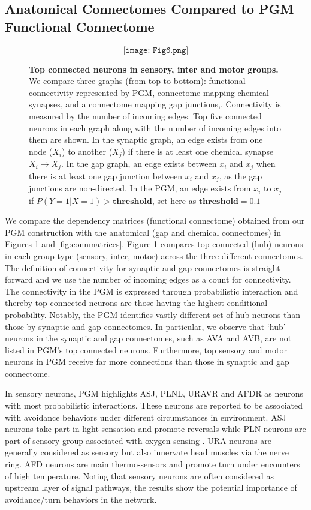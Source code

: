 \documentclass[letterpaper,11pt]{article}
\newcommand\tab[1][6mm]{\hspace*{#1}}
\begin{document}
\subsection{Anatomical Connectomes Compared to  PGM Functional Connectome}
\begin{figure}[h]
  \[\texttt{[image: Fig6.png]}\]
  \caption{\textbf{Top connected neurons in sensory, inter and motor groups.} We compare three graphs (from top to bottom):  functional connectivity represented by PGM, connectome mapping chemical synapses, and a connectome mapping gap junctions,. Connectivity is measured by the number of incoming edges. Top five connected neurons in each graph along with the number of incoming edges into them are shown. In the synaptic graph, an edge exists from one node ($X_i$) to another ($X_j$) if there is at least one chemical synapse $X_i \to X_j$. In the gap graph, an edge exists between $x_i$ and $x_j$ when there is at least one gap junction between $x_i$ and $x_j$, as the gap junctions are non-directed. In the PGM, an edge exists from $x_i$ to $x_j$ if $P(Y=1|X=1)> \textbf{threshold}$, set here as $\textbf{threshold}=0.1$} \label{fig:topconn}
\end{figure}

\tab We compare the dependency matrices (functional connectome) obtained from our PGM construction with the anatomical (gap and chemical connectomes) in Figures \ref{fig:topconn} and \ref{fig:connmatrices}. Figure \ref{fig:topconn} compares top connected (hub) neurons in each group type (sensory, inter, motor) across the three different connectomes. The definition of connectivity for synaptic and gap connectomes is straight forward and we use the number of incoming edges as a count for connectivity. The connectivity in the PGM is expressed through probabilistic interaction and thereby top connected neurons are those having the highest conditional probability. Notably, the PGM identifies vastly different set of hub neurons than those by synaptic and gap connectomes. In particular, we observe that `hub' neurons in the synaptic and gap connectomes, such as AVA and AVB, are not listed in PGM's top connected neurons. Furthermore, top sensory and motor neurons in PGM receive far more connections than those in synaptic and gap connectome.

In sensory neurons, PGM highlights ASJ, PLNL, URAVR and AFDR as neurons with most probabilistic interactions. These neurons are reported to be associated with avoidance behaviors under different circumstances in environment. ASJ neurons take part in light sensation and promote reversals while PLN neurons are part of sensory group associated with oxygen sensing \cite{worm}. URA neurons are generally considered as sensory but also innervate head muscles via the nerve ring. AFD neurons are main thermo-sensors and promote turn under encounters of high temperature. Noting that sensory neurons are often considered as upstream layer of signal pathways, the results show the potential importance of avoidance/turn behaviors in the network.
\end{document}
